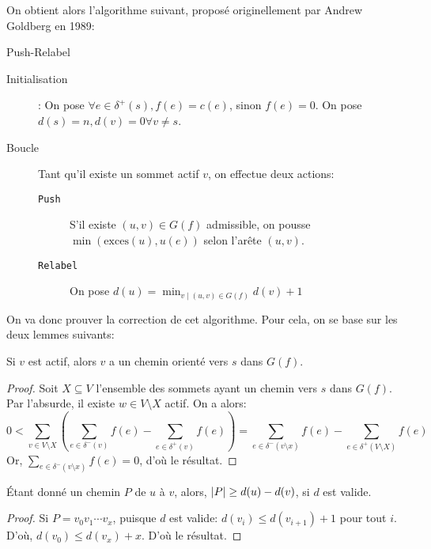 \documentclass[math, info]{cours}
\begin{document}
On obtient alors l'algorithme suivant, proposé originellement par Andrew Goldberg en 1989:
\begin{algorithm}
	\caption{Push-Relabel}
	\label{alg:pushrelabel}
	\begin{description}
		\item[Initialisation]: On pose $\forall e \in \delta^{+}(s), f(e) = c(e)$, sinon $f(e) = 0$.
		      On pose $d(s) = n, d(v) = 0 \forall v \neq s$.
		\item[Boucle] Tant qu'il existe un sommet actif $v$, on effectue deux actions:
		      \begin{description}
			      \item[\tt Push] S'il existe $(u,v) \in G(f)$ admissible, on pousse $\min \left(\mathrm{exces}(u), u(e)\right)$ selon l'arête $(u, v)$.
			      \item[\tt Relabel] On pose $d(u) = \min_{v\mid (u, v) \in G(f)}d(v) + 1$
		      \end{description}
	\end{description}
\end{algorithm}

On va donc prouver la correction de cet algorithme.
Pour cela, on se base sur les deux lemmes suivants:
\begin{lemme}
	Si $v$ est actif, alors $v$ a un chemin orienté vers $s$ dans $G(f)$.
	\label{lem:preflow1}
\end{lemme}
\begin{proof}
	Soit $X \subseteq V$ l'ensemble des sommets ayant un chemin vers $s$ dans $G(f)$.
	Par l'absurde, il existe $w \in V\setminus X$ actif. On a alors:
	\begin{equation*}
		0 < \sum_{v \in V \setminus X} \left(\sum_{e \in \delta^{-}(v)} f(e) - \sum_{e\in \delta^{+}(v)} f(e)\right) = \sum_{e \in \delta^{-}(v\setminus x)} f(e) - \sum_{e\in \delta^{+}(V\setminus X)} f(e)
	\end{equation*}
	Or, $\sum_{e \in \delta^{-}(v\setminus x)} f(e) = 0$, d'où le résultat.
\end{proof}

\begin{lemme}
	Étant donné un chemin $P$ de $u$ à $v$, alors, $\left|P\right| \geq d(u) - d(v)$, si $d$ est valide.
	\label{lem:preflow2}
\end{lemme}
\begin{proof}
	Si $P = v_{0}v_{1}\cdots v_{x}$, puisque $d$ est valide: $d(v_{i}) \leq d(v_{i + 1}) + 1$ pour tout $i$.
	D'où, $d(v_{0}) \leq d(v_{x}) + x$.
	D'où le résultat.
\end{proof}
\end{document}
